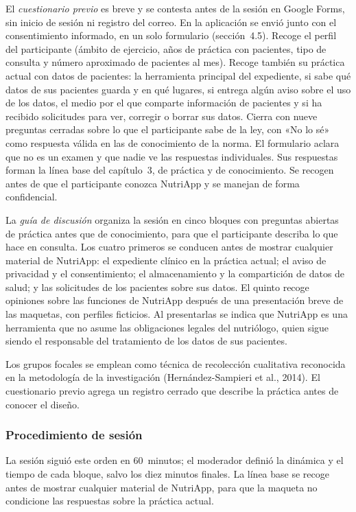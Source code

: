 \documentclass[12pt, a4paper]{article}
\begin{document}
El \textit{cuestionario previo} es breve y se contesta antes de la
sesión en Google Forms, sin inicio de sesión ni registro del correo. En
la aplicación se envió junto con el consentimiento informado, en un solo
formulario (sección~4.5). Recoge el perfil del participante (ámbito de
ejercicio, años de práctica con pacientes, tipo de consulta y número
aproximado de pacientes al mes). Recoge también su práctica actual con
datos de pacientes: la herramienta principal del expediente, si sabe qué
datos de sus pacientes guarda y en qué lugares, si entrega algún aviso
sobre el uso de los datos, el medio por el que comparte información de
pacientes y si ha recibido solicitudes para ver, corregir o borrar sus
datos. Cierra con nueve preguntas cerradas sobre lo que el participante
sabe de la ley, con «No lo sé» como respuesta válida en las de
conocimiento de la norma. El formulario aclara que no es un examen y que
nadie ve las respuestas individuales. Sus respuestas forman la línea
base del capítulo~3, de práctica y de conocimiento. Se recogen antes de
que el participante conozca NutriApp y se manejan de forma confidencial.
 
La \textit{guía de discusión} organiza la sesión en cinco bloques con
preguntas abiertas de práctica antes que de conocimiento, para que el
participante describa lo que hace en consulta. Los cuatro primeros se
conducen antes de mostrar cualquier material de NutriApp: el expediente
clínico en la práctica actual; el aviso de privacidad y el
consentimiento; el almacenamiento y la compartición de datos de salud;
y las solicitudes de los pacientes sobre sus datos. El quinto recoge
opiniones sobre las funciones de NutriApp después de una presentación
breve de las maquetas, con perfiles ficticios. Al presentarlas se
indica que NutriApp es una herramienta que no asume las obligaciones
legales del nutriólogo, quien sigue siendo el responsable del
tratamiento de los datos de sus pacientes.
 
Los grupos focales se emplean como técnica de recolección cualitativa
reconocida en la metodología de la investigación (Hernández-Sampieri
et al., 2014). El cuestionario previo agrega un registro cerrado que
describe la práctica antes de conocer el diseño.
 
\subsubsection{Procedimiento de sesión}
 
La sesión siguió este orden en 60~minutos; el moderador definió la
dinámica y el tiempo de cada bloque, salvo los diez minutos finales. La
línea base se recoge antes de mostrar cualquier material de NutriApp,
para que la maqueta no condicione las respuestas sobre la práctica
actual.
 
\end{document}
